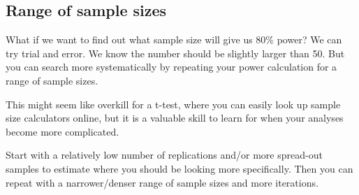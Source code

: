 \documentclass[
  oneside]{book}
\newenvironment{Shaded}{\begin{snugshade}}{\end{snugshade}}
\newcommand{\AttributeTok}[1]{\textcolor[rgb]{0.77,0.63,0.00}{#1}}
\newcommand{\CommentTok}[1]{\textcolor[rgb]{0.56,0.35,0.01}{\textit{#1}}}
\newcommand{\ControlFlowTok}[1]{\textcolor[rgb]{0.13,0.29,0.53}{\textbf{#1}}}
\newcommand{\DecValTok}[1]{\textcolor[rgb]{0.00,0.00,0.81}{#1}}
\newcommand{\FloatTok}[1]{\textcolor[rgb]{0.00,0.00,0.81}{#1}}
\newcommand{\FunctionTok}[1]{\textcolor[rgb]{0.00,0.00,0.00}{#1}}
\newcommand{\NormalTok}[1]{#1}
\newcommand{\OtherTok}[1]{\textcolor[rgb]{0.56,0.35,0.01}{#1}}
\newcommand{\SpecialCharTok}[1]{\textcolor[rgb]{0.00,0.00,0.00}{#1}}
\newcommand{\StringTok}[1]{\textcolor[rgb]{0.31,0.60,0.02}{#1}}
\begin{document}
\hypertarget{range-of-sample-sizes}{%
\subsection{Range of sample sizes}\label{range-of-sample-sizes}}

What if we want to find out what sample size will give us 80\% power? We can try trial and error. We know the number should be slightly larger than 50. But you can search more systematically by repeating your power calculation for a range of sample sizes.

\begin{info}
This might seem like overkill for a t-test, where you can easily look up sample size calculators online, but it is a valuable skill to learn for when your analyses become more complicated.

\end{info}

Start with a relatively low number of replications and/or more spread-out samples to estimate where you should be looking more specifically. Then you can repeat with a narrower/denser range of sample sizes and more iterations.

\begin{Shaded}
\end{Shaded}
\end{document}
